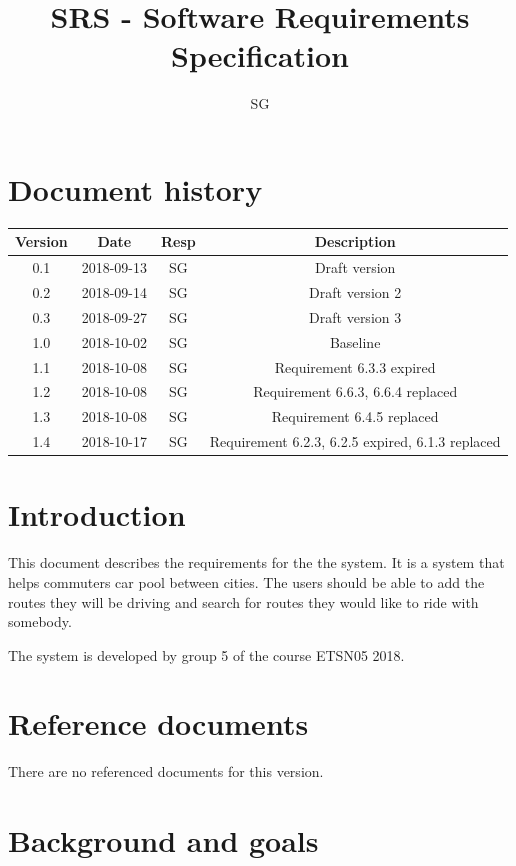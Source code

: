 \documentclass{article}
\title{SRS - Software Requirements Specification}
\begin{document}
\author{SG}

\maketitle
\thispagestyle{fancy}
\tableofcontents
\newpage

\section*{Document history}
 \begin{tabular}{||c c c c||} 
 \hline
 Version & Date & Resp & Description \\ [0.5ex] 
 \hline\hline
 0.1 & 2018-09-13 & SG & Draft version \\ 
 0.2 & 2018-09-14 & SG & Draft version 2 \\
 0.3 & 2018-09-27 & SG & Draft version 3 \\
 1.0 & 2018-10-02 & SG & Baseline \\
 1.1 & 2018-10-08 & SG & Requirement 6.3.3 expired \\
 1.2 & 2018-10-08 & SG & Requirement 6.6.3, 6.6.4 replaced \\
 1.3 & 2018-10-08 & SG & Requirement 6.4.5 replaced \\
 1.4 & 2018-10-17 & SG & Requirement 6.2.3, 6.2.5 expired, 6.1.3 replaced\\
 \hline
 

\end{tabular}

\section{Introduction}
This document describes the requirements for the the system. It is a system that helps commuters car pool between cities. The users should be able to add the routes they will be driving and search for routes they would like to ride with somebody.

The system is developed by group 5 of the course ETSN05 2018.

\section{Reference documents}
There are no referenced documents for this version.
\section{Background and goals}
\end{document}
